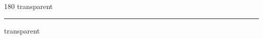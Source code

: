 
\begin{frame}
\begin{center}
\begin{turn}{180}
{\fontsize{2.5cm}{1em}\selectfont transparent}
\end{turn}
\vspace{1em}\par  
\hrule
\vspace{1em}\par  
{\fontsize{2.5cm}{1em}\selectfont transparent}
\end{center}
\end{frame}
